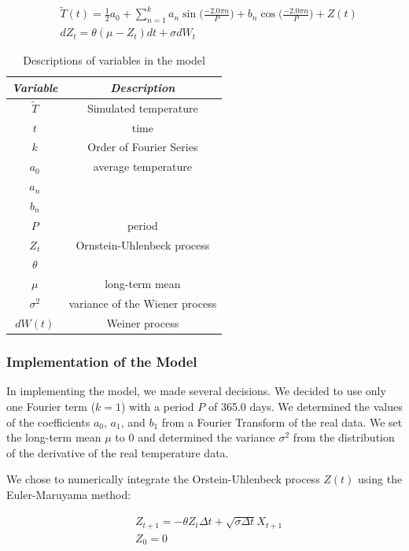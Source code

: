 \documentclass[11pt, letterpaper]{article}
\begin{document}
\begin{align}
&\tilde{T}(t) = \frac{1}{2}a_0 + \sum_{n=1}^k a_n \sin\Big(\frac{-2.0 \pi n}{P}\Big) + b_n \cos\Big(\frac{-2.0 \pi n}{P}\Big) + Z(t) \\
&dZ_t = \theta (\mu - Z_t)dt + \sigma dW_t
\end{align}

\begin{table}[H]
  \centering
  \begin{tabular}{c c} \hline
  \emph{Variable} & \emph{Description}\\ \hline
  $\tilde{T}$ & Simulated temperature \\ \hline
  $t$ & time \\ \hline
  $k$ & Order of Fourier Series \\ \hline
  $a_0$ & average temperature \\ \hline
  $a_n$ & \\ \hline
  $b_n$ &  \\ \hline
  $P$ & period  \\ \hline
  $Z_t$ & Ornstein-Uhlenbeck process \\ \hline
  $\theta$ & \\ \hline
  $\mu$ & long-term mean \\ \hline
  $\sigma^2$ & variance of the Wiener process \\ \hline
  $dW(t)$ & Weiner process \\ \hline 
  \end{tabular}
  \caption{Descriptions of variables in the model}
  \label{tab:analysis-ft-values}
\end{table}


\subsubsection{Implementation of the Model}
In implementing the model, we made several decisions.  We decided to use only one Fourier term ($k=1$) with a period $P$ of 365.0 days.  We determined the values of the coefficients $a_0$, $a_1$, and $b_1$ from a Fourier Transform of the real data.  We set the long-term mean $\mu$ to 0 and determined the variance $\sigma^2$ from the distribution of the derivative of the real temperature data.

We chose to numerically integrate the Orstein-Uhlenbeck process $Z(t)$ using the Euler-Maruyama method:

\begin{align}
&Z_{t+1} = - \theta Z_t \Delta t + \sqrt{\sigma \Delta t} X_{t+1} \\
&Z_0 = 0
\end{align}
\end{document}
